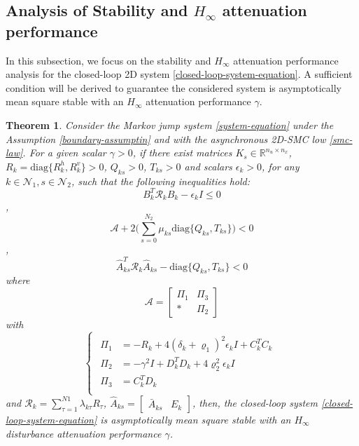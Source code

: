 \documentclass[conference]{IEEEtran}
\newtheorem{theorem}{Theorem}
\begin{document}
\subsection{Analysis of Stability and $H_{\infty}$ attenuation performance } \label{stability&H_infty}
 In this subsection, we focus on the stability and $H_{\infty}$ attenuation performance analysis for the closed-loop 2D system \eqref{closed-loop-system-equation}. A sufficient condition will be derived to guarantee the considered system is  asymptotically mean square stable with an $H_{\infty}$ attenuation performance $\gamma$.
\begin{theorem}\label{theorem1}
	Consider the  Markov jump system \eqref{system-equation} under the Assumption \eqref{boundary-assumptin} and with the asynchronous 2D-SMC low \eqref{smc-law}. For a given scalar $\gamma>0$, if there exist matrices $K_{s}\in\mathbb{R}^{n_u\times n_x}$,  $R_{k}=\mathrm{diag}\{R^{h}_{k},R^{v}_{k}\}>0$,  $Q_{ks}>0$, $T_{ks}>0$ and scalars $\epsilon_{k}>0$, for any $k\in\mathcal{N}_{1}, s\in\mathcal{N}_{2}$,  such that the following inequalities hold: 
	\begin{equation}\label{T1C1}
	B^{T}_{k}  	\mathcal{R}_{k} B_{k} -\epsilon_{k}I \leq 0
	\end{equation},
	\begin{equation}\label{T1C2}
	\mathcal{A} +2\Big(\sum_{s=0}^{N_{2}}\mu_{ks} \mathrm{diag}\{Q_{ks}, T_{ks}\}\Big) < 0
	\end{equation},
	\begin{equation}\label{T1C3}
	\hat{A}^{T}_{ks}\mathcal{R}_{k}\hat{A}_{ks} - \mathrm{diag}\{Q_{ks}, T_{ks}\} < 0
	\end{equation}
	where
	\begin{equation*}
	\mathcal{A}=\begin{bmatrix}
	\varPi_{1} & \varPi_{3}\\
	*&\varPi_{2}
	\end{bmatrix}
	\end{equation*} with
	\begin{equation*} \label{varPi}
	\left\{
	\begin{array}{lr}
	\begin{split}
	\varPi_{1}&=-R_{k}+4(\delta_{k}+\varrho_{1})^{2}\epsilon_{k}I+C^{T}_{k}C_{k}\\
	\varPi_{2}&=-\gamma^{2}I+D^{T}_{k}D_{k}+4\varrho_{2}^{2}\epsilon_{k}I\\
	\varPi_{3}&= C_{k}^{T}D_{k}\\
	\end{split}
	\end{array}
	\right.
	\end{equation*}
	and $\mathcal{R}_{k}=\sum_{\tau=1}^{N1}\lambda_{k\tau}R_{\tau}$, $\hat{A}_{ks}=\begin{bmatrix}
	\bar{A}_{ks}& E_{k}
	\end{bmatrix}$, 
	then, the closed-loop system \eqref{closed-loop-system-equation} is asymptotically mean square stable with an $H_{\infty}$ disturbance attenuation performance $\gamma$.
\end{theorem}
\end{document}
